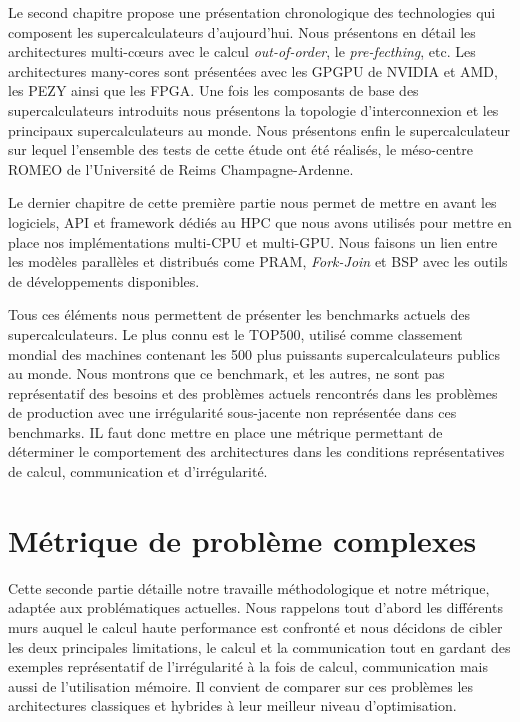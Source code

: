 \documentclass[12pt,a4paper]{report}
\begin{document}
Le second chapitre propose une présentation chronologique des technologies qui composent les supercalculateurs d'aujourd'hui.
Nous présentons en détail les architectures multi-cœurs avec le calcul \textit{out-of-order}, le \textit{pre-fecthing}, etc.
Les architectures many-cores sont présentées avec les GPGPU de NVIDIA et AMD, les PEZY ainsi que les FPGA.
Une fois les composants de base des supercalculateurs introduits nous présentons la topologie d'interconnexion et les principaux supercalculateurs au monde.
Nous présentons enfin le supercalculateur sur lequel l'ensemble des tests de cette étude ont été réalisés, le méso-centre ROMEO de l'Université de Reims Champagne-Ardenne.

Le dernier chapitre de cette première partie nous permet de mettre en avant les logiciels, API et framework dédiés au HPC que nous avons utilisés pour mettre en place nos implémentations multi-CPU et multi-GPU. 
Nous faisons un lien entre les modèles parallèles et distribués come PRAM, \textit{Fork-Join} et BSP avec les outils de développements disponibles. 

Tous ces éléments nous permettent de présenter les benchmarks actuels des supercalculateurs. 
Le plus connu est le TOP500, utilisé comme classement mondial des machines contenant les 500 plus puissants supercalculateurs publics au monde. 
Nous montrons que ce benchmark, et les autres, ne sont pas représentatif des besoins et des problèmes actuels rencontrés dans les problèmes de production avec une irrégularité sous-jacente non représentée dans ces benchmarks. 
IL faut donc mettre en place une métrique permettant de déterminer le comportement des architectures dans les conditions représentatives de calcul, communication et d'irrégularité. 

\section{Métrique de problème complexes}
Cette seconde partie détaille notre travaille méthodologique et notre métrique, adaptée aux problématiques actuelles. 
Nous rappelons tout d'abord les différents murs auquel le calcul haute performance est confronté et nous décidons de cibler les deux principales limitations, le calcul et la communication tout en gardant des exemples représentatif de l'irrégularité à la fois de calcul, communication mais aussi de l'utilisation mémoire. 
Il convient de comparer sur ces problèmes les architectures classiques et hybrides à leur meilleur niveau d'optimisation.
\end{document}

